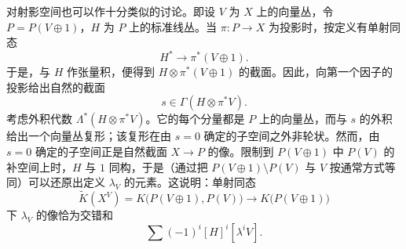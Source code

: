对射影空间也可以作十分类似的讨论。即设 $V$ 为 $X$ 上的向量丛，令 $P=P(V\oplus1)$，$H$ 为 $P$ 上的标准线丛。当 $\pi\colon P\to X$ 为投影时，按定义有单射同态
\[
H^*\longrightarrow\pi^*(V\oplus1).
\]
于是，与 $H$ 作张量积，便得到 $H\otimes\pi^*(V\oplus1)$ 的截面。因此，向第一个因子的投影给出自然的截面
\[
s\in\Gamma(H\otimes\pi^*V).
\]
考虑外积代数 $\Lambda^*(H\otimes\pi^*V)$。它的每个分量都是 $P$ 上的向量丛，而与 $s$ 的外积给出一个向量丛复形；该复形在由 $s=0$ 确定的子空间之外非轮状。然而，由 $s=0$ 确定的子空间正是自然截面 $X\to P$ 的像。限制到 $P(V\oplus1)$ 中 $P(V)$ 的补空间上时，$H$ 与 $1$ 同构，于是（通过把 $P(V\oplus1)\setminus P(V)$ 与 $V$ 按通常方式等同）可以还原出定义 $\lambda_V$ 的元素。这说明：单射同态
\[
\tilde K(X^V)=K\bigl(P(V\oplus1),P(V)\bigr)\longrightarrow K\bigl(P(V\oplus1)\bigr)
\]
下 $\lambda_V$ 的像恰为交错和
\[
\sum(-1)^i[H]^i[\lambda^iV].
\]

